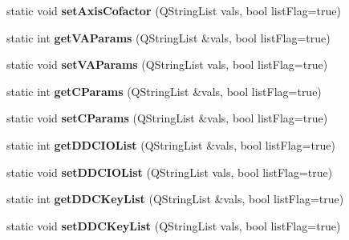 \begin{DoxyCompactItemize}
\item 
\hypertarget{classRobotConf_a6c334aa43537f55d961155150403951e}{static void {\bfseries set\-Axis\-Cofactor} (Q\-String\-List vals, bool list\-Flag=true)}\label{classRobotConf_a6c334aa43537f55d961155150403951e}

\item 
\hypertarget{classRobotConf_a95919bcc31ca3688ceb25ad602973443}{static int {\bfseries get\-V\-A\-Params} (Q\-String\-List \&vals, bool list\-Flag=true)}\label{classRobotConf_a95919bcc31ca3688ceb25ad602973443}

\item 
\hypertarget{classRobotConf_a74a11e3c68f9e8f825b97dc8997cd421}{static void {\bfseries set\-V\-A\-Params} (Q\-String\-List vals, bool list\-Flag=true)}\label{classRobotConf_a74a11e3c68f9e8f825b97dc8997cd421}

\item 
\hypertarget{classRobotConf_ace248e988f6138601d79fba5e76fcbd4}{static int {\bfseries get\-C\-Params} (Q\-String\-List \&vals, bool list\-Flag=true)}\label{classRobotConf_ace248e988f6138601d79fba5e76fcbd4}

\item 
\hypertarget{classRobotConf_ac702642d3fbcbfb6587c4c96cb7d197f}{static void {\bfseries set\-C\-Params} (Q\-String\-List \&vals, bool list\-Flag=true)}\label{classRobotConf_ac702642d3fbcbfb6587c4c96cb7d197f}

\item 
\hypertarget{classRobotConf_a67ccf8e59336a59638a130b73850be0d}{static int {\bfseries get\-D\-D\-C\-I\-O\-List} (Q\-String\-List \&vals, bool list\-Flag=true)}\label{classRobotConf_a67ccf8e59336a59638a130b73850be0d}

\item 
\hypertarget{classRobotConf_a041488e0facbac8d14b6d10061ea6406}{static void {\bfseries set\-D\-D\-C\-I\-O\-List} (Q\-String\-List vals, bool list\-Flag=true)}\label{classRobotConf_a041488e0facbac8d14b6d10061ea6406}

\item 
\hypertarget{classRobotConf_a92f393a69f1826adc356c267b29218db}{static int {\bfseries get\-D\-D\-C\-Key\-List} (Q\-String\-List \&vals, bool list\-Flag=true)}\label{classRobotConf_a92f393a69f1826adc356c267b29218db}

\item 
\hypertarget{classRobotConf_a65ed89acdfe30b03e4e50ba5c88fc4f7}{static void {\bfseries set\-D\-D\-C\-Key\-List} (Q\-String\-List vals, bool list\-Flag=true)}\label{classRobotConf_a65ed89acdfe30b03e4e50ba5c88fc4f7}


\end{DoxyCompactItemize}
